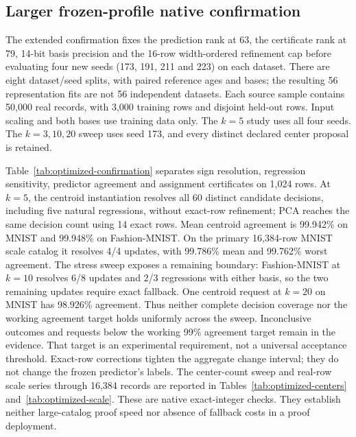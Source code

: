 \subsection{Larger frozen-profile native confirmation}
The extended confirmation fixes the prediction rank at 63, the certificate
rank at 79, 14-bit basis precision and the 16-row width-ordered refinement
cap before evaluating four new seeds (173, 191, 211 and 223) on each dataset.
There are eight dataset/seed splits, with paired reference ages and bases;
the resulting 56 representation fits are not 56 independent datasets.
Each source sample contains 50,000 real records, with 3,000 training rows
and disjoint held-out rows. Input scaling and both bases use training data
only. The $k=5$ study uses all four seeds. The $k=3,10,20$ sweep uses seed
173, and every distinct declared center proposal is retained.

Table~\ref{tab:optimized-confirmation} separates sign resolution, regression
sensitivity, predictor agreement and assignment certificates on 1,024 rows.
At $k=5$, the centroid instantiation resolves all 60 distinct candidate
decisions, including five natural regressions, without exact-row refinement;
PCA reaches the same decision count using 14 exact rows. Mean centroid
agreement is 99.942\% on MNIST and 99.948\% on Fashion-MNIST. On the primary
16,384-row MNIST scale catalog it resolves 4/4 updates, with 99.786\% mean
and 99.762\% worst agreement.
The stress sweep exposes a remaining boundary: Fashion-MNIST at $k=10$
resolves 6/8 updates and 2/3 regressions with either basis, so the two
remaining updates require exact fallback. One centroid request at $k=20$
on MNIST has 98.926\% agreement. Thus neither complete decision coverage
nor the working agreement target holds uniformly across the sweep.
Inconclusive outcomes and requests below the working 99\% agreement target
remain in the evidence. That target is an experimental requirement, not a
universal acceptance threshold. Exact-row corrections tighten the aggregate
change interval; they do not change the frozen predictor's labels.
The center-count sweep and real-row scale series through 16,384 records are
reported in Tables~\ref{tab:optimized-centers} and~\ref{tab:optimized-scale}.
These are native exact-integer checks. They establish neither large-catalog
proof speed nor absence of fallback costs in a proof deployment.

